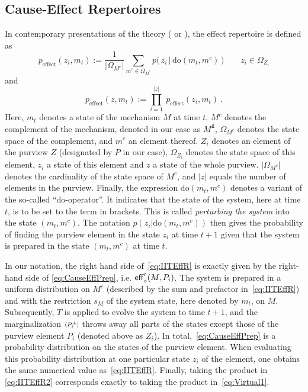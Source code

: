 \subsection{Cause-Effect Repertoires}
In contemporary presentations of the theory (\cite[p.\,14]{marshall2016integrated} or \cite{tononi.2015.scholarpedia}), the effect repertoire
is defined as 
\begin{equation}\label{eq:IITEffR}
p_{\textrm{effect}}(z_i, m_t) := \frac{1}{|\Omega_{M^c}|} \sum_{m^c \in \Omega_{M^c}} p \big( \, z_i \, | \, \textrm{do}(m_t, m^c) \, \big) \qquad z_i \in \Omega_{Z_i} 
\end{equation}
and
\begin{equation}\label{eq:IITEffR2}
p_{\textrm{effect}}(z, m_t) := \prod_{i=1}^{|z|} \ p_{\textrm{effect}}(z_i, m_t) \:.
\end{equation}
Here, $m_t$ denotes a state of the mechanism $M$ at time $t$. $M^c$ denotes the complement of the mechanism, denoted in our case as $M^\Bot$, $\Omega_{M^c}$ denotes the state space of the complement, and $m^c$ an element thereof. 
$Z_i$ denotes an element of the purview $Z$ (designated by $P$ in our case), $\Omega_{Z_i}$ denotes the state space of this element, $z_i$ a state of this element and $z$ a state of the whole purview. $|\Omega_{M^c}|$ denotes the cardinality of the state space of $M^c$, and $|z|$ equals the number of elements in the purview.
Finally, the expression $\textrm{do}(m_t, m^c)$ denotes a variant of the so-called ``do-operator''. It indicates that the state of the system, here at time $t$, is to be set to the term in brackets. This is called \emph{perturbing the system} into the state $(m_t, m^c)$. The notation $p ( z_i |  \textrm{do}(m_t, m^c) )$ then gives the probability of finding the purview element in the state $z_i$ at time $t+1$ given that the system is prepared in the state $(m_t, m^c)$ at time $t$.


In our notation, the right hand side of~\eqref{eq:IITEffR} is exactly given by the right-hand side of \eqref{eq:CauseEffPrep}, i.e. $\mathsf{eff}'_s(M,P_i)$. The system is prepared in a uniform distribution on $M^c$ (described by the sum and prefactor in~\eqref{eq:IITEffR}) and with the restriction $s_M$ of the system state, here denoted by $m_t$, on $M$. Subsequently, $T$ is applied to evolve the system to time $t+1$, and the marginalization ${\scriptstyle \langle P_i^{\scriptscriptstyle \bot} |}$ throws away all parts of the states except those of the purview element $P_i$ (denoted above as $Z_i$). In total,~\eqref{eq:CauseEffPrep} is a probability distribution on the states of the purview element. When evaluating this probability distribution at one particular state $z_i$ of the element, one obtains the same numerical value as~\eqref{eq:IITEffR}. Finally, taking the product in \eqref{eq:IITEffR2} corresponds exactly to taking the product in~\eqref{eq:Virtual1}.\medskip

